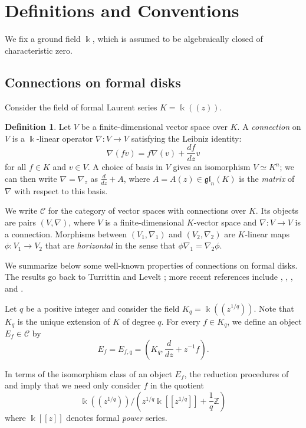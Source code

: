 \documentclass[11pt]{amsart}
\theoremstyle{plain}
\theoremstyle{definition}
\newtheorem{definition}[theorem]{Definition}
\theoremstyle{remark}
\newcommand\gl{\mathfrak{gl}}
\begin{document}
\section{Definitions and Conventions}\label{sec def}

We fix a ground field $\Bbbk$, which is assumed to be algebraically closed of characteristic zero.

\subsection{Connections on formal disks}\label{subsec conn}
Consider the field of formal Laurent series $K=\Bbbk((z))$.

\begin{definition} \label{connection} Let $V$ be a finite-dimensional vector space over $K$. A \emph{connection} on $V$ is a $\Bbbk$-linear operator
$\nabla\colon V\to V$ satisfying the Leibniz identity:
\[\nabla(fv)=f\nabla(v)+\frac{df}{dz}v\]
for all $f\in K$ and $v\in V$. A choice of basis in $V$ gives an isomorphism $V\simeq K^n$; we can then write $\nabla=\nabla_z$ as $\frac{d}{dz}+A$, where
$A=A(z)\in\gl_n(K)$ is the \emph{matrix} of $\nabla$ with respect to this basis.
\end{definition}

We write $\mathcal{C}$ for the category of vector spaces with connections over $K$. Its objects are pairs
$(V, \nabla)$, where $V$ is a finite-dimensional $K$-vector space and $\nabla\colon V\to V$ is a connection. Morphisms between
$(V_1,\nabla_1)$ and $(V_2,\nabla_2)$ are $K$-linear maps $\phi\colon V_1\to V_2$ that are \emph{horizontal} in the sense that
$\phi\nabla_1=\nabla_2\phi$.

 We summarize below some well-known
properties of connections on formal disks. The results go back to Turrittin \cite{turrittin} and Levelt \cite{levelt};
more recent references include \cite{varadar}, \cite[Sections 5.9 and 5.10]{beilinson}, \cite{malgrange}, and \cite{vander}.

Let $q$ be a positive integer and consider the field $K_q=\Bbbk((z^{1/q}))$. Note that $K_q$ is the unique extension of $K$ of degree $q$.
For every $f\in K_q$, we define an object $E_f\in\mathcal{C}$ by
\[E_f=E_{f,q}=\left(K_q,\frac{d}{dz}+z^{-1}f\right).\]

In terms of the isomorphism class of an object $E_f$, the reduction procedures of \cite{turrittin} and \cite{levelt} imply that we need only consider $f$ in the quotient
\begin{equation}\label{conn equation}
\Bbbk((z^{1/q}))\Big/\left(z^{1/q}\Bbbk[[z^{1/q}]]+\frac{1}{q}\mathbb{Z}\right)
\end{equation}
where $\Bbbk[[z]]$ denotes formal \emph{power} series.
\end{document}
